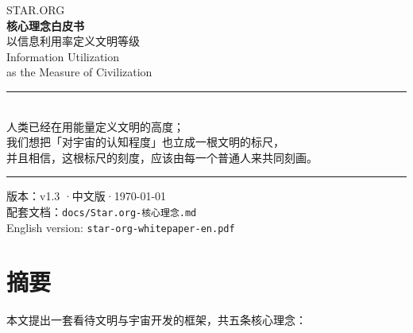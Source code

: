 \documentclass[11pt,fontset=none]{ctexart}
\newcommand{\WHLANG}{中文版}
\begin{document}
\begin{titlepage}
\centering
\vspace*{28mm}

{\sffamily\footnotesize\color{gold}\MakeUppercase{Star.org}}\\[6mm]

{\sffamily\Huge\bfseries\color{accent} 核心理念白皮书}\\[5mm]

{\sffamily\large\color{inksoft} 以信息利用率定义文明等级}\\[3mm]

{\sffamily\normalsize\color{inkfaint} Information Utilization\\ as the Measure of Civilization}\\[16mm]

\textcolor{line}{\rule{\linewidth}{0.6pt}}\\[8mm]

{\normalsize\color{inksoft}
人类已经在用能量定义文明的高度；\\
我们想把「对宇宙的认知程度」也立成一根文明的标尺，\\
并且相信，这根标尺的刻度，应该由每一个普通人来共同刻画。}\\[8mm]

\textcolor{line}{\rule{\linewidth}{0.6pt}}

\vfill

{\small\color{inkfaint}
版本：v1.3 \quad·\quad \WHLANG \quad·\quad \today\\[2mm]
配套文档：\texttt{docs/Star.org-核心理念.md}\\[1mm]
English version: \texttt{star-org-whitepaper-en.pdf}}

\vspace*{16mm}
\end{titlepage}

\tableofcontents
\newpage

\section*{摘要}

本文提出一套看待文明与宇宙开发的框架，共五条核心理念：
\end{document}
